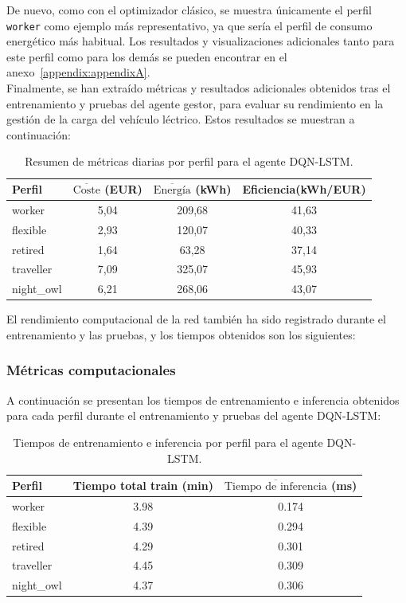 De nuevo, como con el optimizador clásico, se muestra únicamente el perfil \texttt{worker} como
ejemplo más representativo, ya que sería el perfil de consumo energético más habitual. Los
resultados y visualizaciones adicionales tanto para este perfil como para los demás se pueden
encontrar en el anexo~\ref{appendix:appendixA}.\\

Finalmente, se han extraído métricas y resultados adicionales obtenidos tras el entrenamiento y 
pruebas del agente gestor, para evaluar su rendimiento en la gestión de la carga del vehículo
léctrico. Estos resultados se muestran a continuación:
\begin{table}[H]
    \centering
    \begin{tabular}{lccc}
            \textbf{Perfil} & $\overline{\text{Coste}}$ (EUR) & $\overline{\text{Energía}}$ (kWh) & Eficiencia(kWh/EUR) \\
        \midrule
        worker      & 5,04  & 209,68 & 41,63 \\
        flexible    & 2,93  & 120,07 & 40,33 \\
        retired     & 1,64  & 63,28  & 37,14 \\
        traveller   & 7,09  & 325,07 & 45,93 \\
        night\_owl  & 6,21  & 268,06 & 43,07 \\
        \bottomrule
    \end{tabular}
    \caption{Resumen de métricas diarias por perfil para el agente DQN-LSTM.}
    \label{tab:metrics_dqn_summary}
\end{table}

El rendimiento computacional de la red también ha sido registrado durante el entrenamiento y las 
pruebas, y los tiempos obtenidos son los siguientes:
\subsubsection{Métricas computacionales}
A continuación se presentan los tiempos de entrenamiento e inferencia obtenidos para cada perfil durante el entrenamiento y pruebas del agente DQN-LSTM:

\begin{table}[H]
    \centering
    \begin{tabular}{lcc}
        \toprule
        \textbf{Perfil} & \textbf{Tiempo total train (min)} & \textbf{\(\overline{\text{Tiempo de inferencia}}\) (ms)} \\
        \midrule
        worker      & 3.98 & 0.174 \\
        flexible    & 4.39 & 0.294 \\
        retired     & 4.29 & 0.301 \\
        traveller   & 4.45 & 0.309 \\
        night\_owl  & 4.37 & 0.306 \\
        \bottomrule
    \end{tabular}
    \caption{Tiempos de entrenamiento e inferencia por perfil para el agente DQN-LSTM.}
\end{table}


